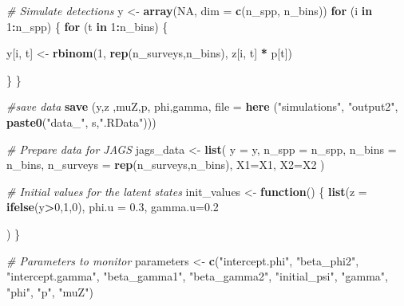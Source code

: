 \documentclass[
]{article}
\newenvironment{Shaded}{\begin{snugshade}}{\end{snugshade}}
\newcommand{\AttributeTok}[1]{\textcolor[rgb]{0.13,0.29,0.53}{#1}}
\newcommand{\CommentTok}[1]{\textcolor[rgb]{0.56,0.35,0.01}{\textit{#1}}}
\newcommand{\ConstantTok}[1]{\textcolor[rgb]{0.56,0.35,0.01}{#1}}
\newcommand{\ControlFlowTok}[1]{\textcolor[rgb]{0.13,0.29,0.53}{\textbf{#1}}}
\newcommand{\DecValTok}[1]{\textcolor[rgb]{0.00,0.00,0.81}{#1}}
\newcommand{\FloatTok}[1]{\textcolor[rgb]{0.00,0.00,0.81}{#1}}
\newcommand{\FunctionTok}[1]{\textcolor[rgb]{0.13,0.29,0.53}{\textbf{#1}}}
\newcommand{\NormalTok}[1]{#1}
\newcommand{\OtherTok}[1]{\textcolor[rgb]{0.56,0.35,0.01}{#1}}
\newcommand{\SpecialCharTok}[1]{\textcolor[rgb]{0.81,0.36,0.00}{\textbf{#1}}}
\newcommand{\StringTok}[1]{\textcolor[rgb]{0.31,0.60,0.02}{#1}}
\begin{document}
{\begin{Shaded}
\begin{Highlighting}[]
        \CommentTok{\# Simulate detections}
\NormalTok{        y }\OtherTok{\textless{}{-}} \FunctionTok{array}\NormalTok{(}\ConstantTok{NA}\NormalTok{, }\AttributeTok{dim =} \FunctionTok{c}\NormalTok{(n\_spp, n\_bins))}
        \ControlFlowTok{for}\NormalTok{ (i }\ControlFlowTok{in} \DecValTok{1}\SpecialCharTok{:}\NormalTok{n\_spp) \{}
          \ControlFlowTok{for}\NormalTok{ (t }\ControlFlowTok{in} \DecValTok{1}\SpecialCharTok{:}\NormalTok{n\_bins) \{}
            
\NormalTok{              y[i, t] }\OtherTok{\textless{}{-}} \FunctionTok{rbinom}\NormalTok{(}\DecValTok{1}\NormalTok{, }\FunctionTok{rep}\NormalTok{(n\_surveys,n\_bins), z[i, t] }\SpecialCharTok{*}\NormalTok{ p[t])}
            
\NormalTok{          \}}
\NormalTok{        \}}
        
        \CommentTok{\#save data}
        \FunctionTok{save}\NormalTok{ (y,z ,muZ,p, phi,gamma, }\AttributeTok{file =} \FunctionTok{here}\NormalTok{ (}\StringTok{"simulations"}\NormalTok{, }\StringTok{"output2"}\NormalTok{, }\FunctionTok{paste0}\NormalTok{(}\StringTok{"data\_"}\NormalTok{, s,}\StringTok{".RData"}\NormalTok{)))}
        
        \CommentTok{\# Prepare data for JAGS}
\NormalTok{        jags\_data }\OtherTok{\textless{}{-}} \FunctionTok{list}\NormalTok{(}
          \AttributeTok{y =}\NormalTok{ y,}
          \AttributeTok{n\_spp =}\NormalTok{ n\_spp,}
          \AttributeTok{n\_bins =}\NormalTok{ n\_bins,}
          \AttributeTok{n\_surveys =} \FunctionTok{rep}\NormalTok{(n\_surveys,n\_bins),}
          \AttributeTok{X1=}\NormalTok{X1,}
          \AttributeTok{X2=}\NormalTok{X2}
\NormalTok{        )}
        
        \CommentTok{\# Initial values for the latent states}
\NormalTok{        init\_values }\OtherTok{\textless{}{-}} \ControlFlowTok{function}\NormalTok{() \{}
          \FunctionTok{list}\NormalTok{(}\AttributeTok{z =} \FunctionTok{ifelse}\NormalTok{(y}\SpecialCharTok{\textgreater{}}\DecValTok{0}\NormalTok{,}\DecValTok{1}\NormalTok{,}\DecValTok{0}\NormalTok{),}
               \AttributeTok{phi.u =} \FloatTok{0.3}\NormalTok{,}
               \AttributeTok{gamma.u=}\FloatTok{0.2}
               
\NormalTok{               )}
\NormalTok{        \}}
        
        \CommentTok{\# Parameters to monitor}
\NormalTok{        parameters }\OtherTok{\textless{}{-}} \FunctionTok{c}\NormalTok{(}\StringTok{"intercept.phi"}\NormalTok{,}
                        \StringTok{"beta\_phi2"}\NormalTok{,}
                        \StringTok{"intercept.gamma"}\NormalTok{,}
                        \StringTok{"beta\_gamma1"}\NormalTok{,}
                        \StringTok{"beta\_gamma2"}\NormalTok{,}
                        \StringTok{"initial\_psi"}\NormalTok{, }
                        \StringTok{"gamma"}\NormalTok{,}
                        \StringTok{"phi"}\NormalTok{,}
                        \StringTok{"p"}\NormalTok{, }
                        \StringTok{"muZ"}\NormalTok{)}
        

\end{Highlighting}
\end{Shaded}}
\end{document}
